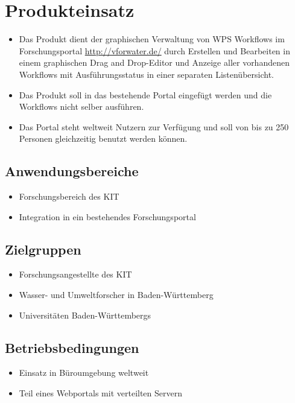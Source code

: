
\chapter{Produkteinsatz}
    \begin{itemize}
    	\item Das Produkt dient der graphischen Verwaltung von WPS Workflows im Forschungsportal \url{http://vforwater.de/} durch Erstellen und Bearbeiten in einem graphischen \Gls{Drag and Drop}-Editor und Anzeige aller vorhandenen Workflows mit Ausführungsstatus in einer separaten Listenübersicht.
    	\item Das Produkt soll in das bestehende Portal eingefügt werden und die Workflows nicht selber ausführen.
    	\item Das Portal steht weltweit Nutzern zur Verfügung und soll von bis zu 250 Personen gleichzeitig benutzt werden können.
    \end{itemize}
	
	\section{Anwendungsbereiche}
		\begin{itemize}
			\item Forschungsbereich des KIT
			\item Integration in ein bestehendes Forschungsportal
		\end{itemize}	
	
	\section{Zielgruppen}
		\begin{itemize}
			\item Forschungsangestellte des KIT
			\item Wasser- und Umweltforscher in Baden-Württemberg
			\item Universitäten Baden-Württembergs
		\end{itemize}	
	
	\section{Betriebsbedingungen}
		\begin{itemize}
			\item Einsatz in Büroumgebung weltweit
			\item Teil eines Webportals mit verteilten Servern
		\end{itemize}	
	